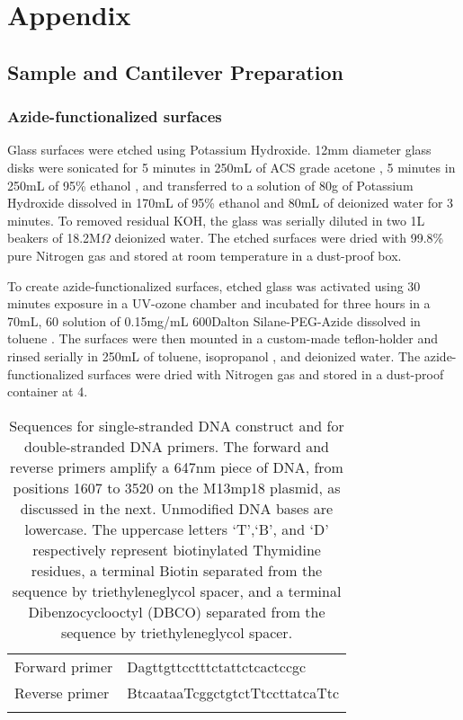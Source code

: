 \section{Appendix}

\subsection{Sample and Cantilever Preparation}

\subsubsection{Azide-functionalized surfaces}

\firstp Glass surfaces were etched using Potassium Hydroxide. 12mm diameter glass disks  were sonicated  for 5 minutes in 250mL of ACS grade acetone , 5 minutes in 250mL of 95\% ethanol , and transferred to a solution of 80g of Potassium Hydroxide  dissolved in  170mL of 95\% ethanol and 80mL of deionized water  for 3 minutes. To removed residual KOH, the glass was serially diluted in two 1L beakers of 18.2M$\Omega$ deionized water. The etched surfaces were dried with 99.8\% pure Nitrogen gas  and stored at room temperature in a dust-proof box. \pl

To create azide-functionalized surfaces, etched glass was activated using 30 minutes exposure in a UV-ozone chamber  and incubated for three hours in a 70mL, 60\degreeC{} solution of 0.15mg/mL 600Dalton Silane-PEG-Azide  dissolved in toluene . The surfaces were then mounted in a custom-made teflon-holder and rinsed serially in 250mL of toluene, isopropanol , and deionized water. The azide-functionalized surfaces were dried with Nitrogen gas and stored in a dust-proof container at 4\degreeC{}. \pl 


\begin{table}
\begin{tabularx}{\textwidth}{ l | l  }
\hline \hline
Forward primer & Dagttgttcctttctattctcactccgc \\ \e 
Reverse primer & BtcaataaTcggctgtctTtccttatcaTtc \\ \e 
\end{tabularx}
\caption[DNA primer sequences]{Sequences for single-stranded DNA construct and for double-stranded DNA primers. The forward and reverse primers amplify a 647nm piece of DNA, from positions 1607 to 3520 on the M13mp18 plasmid, as discussed in the next. Unmodified DNA bases are lowercase. The uppercase letters `T',`B', and `D' respectively represent biotinylated Thymidine residues, a terminal Biotin separated from the sequence by triethyleneglycol spacer, and a terminal Dibenzocyclooctyl (DBCO) separated from the sequence by triethyleneglycol spacer.}
\end{table}

